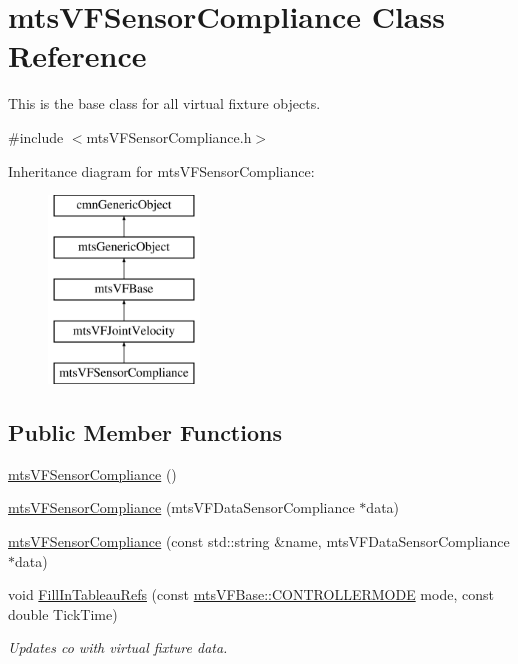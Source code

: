 \hypertarget{classmts_v_f_sensor_compliance}{}\section{mts\+V\+F\+Sensor\+Compliance Class Reference}
\label{classmts_v_f_sensor_compliance}


This is the base class for all virtual fixture objects.  




{\ttfamily \#include $<$mts\+V\+F\+Sensor\+Compliance.\+h$>$}

Inheritance diagram for mts\+V\+F\+Sensor\+Compliance\+:\begin{figure}[H]
\begin{center}
\leavevmode
\includegraphics[height=5.000000cm]{d8/d19/classmts_v_f_sensor_compliance}
\end{center}
\end{figure}
\subsection*{Public Member Functions}
\begin{DoxyCompactItemize}
\item 
\hyperlink{classmts_v_f_sensor_compliance_a04149c581d37be0d4eef8c4b0400a23d}{mts\+V\+F\+Sensor\+Compliance} ()
\item 
\hyperlink{classmts_v_f_sensor_compliance_a0c318ec723ca96689e21368edf0be9d3}{mts\+V\+F\+Sensor\+Compliance} (mts\+V\+F\+Data\+Sensor\+Compliance $\ast$data)
\item 
\hyperlink{classmts_v_f_sensor_compliance_a79a35b2ec8e99b4c7388826c69369058}{mts\+V\+F\+Sensor\+Compliance} (const std\+::string \&name, mts\+V\+F\+Data\+Sensor\+Compliance $\ast$data)
\item 
void \hyperlink{classmts_v_f_sensor_compliance_ade8b115639befe8b99fbe700ef092c06}{Fill\+In\+Tableau\+Refs} (const \hyperlink{classmts_v_f_base_a742dd08f8b70bafeb746cec14d9ee974}{mts\+V\+F\+Base\+::\+C\+O\+N\+T\+R\+O\+L\+L\+E\+R\+M\+O\+D\+E} mode, const double Tick\+Time)
\begin{DoxyCompactList}\small\item\em Updates co with virtual fixture data. \end{DoxyCompactList}\end{DoxyCompactItemize}
